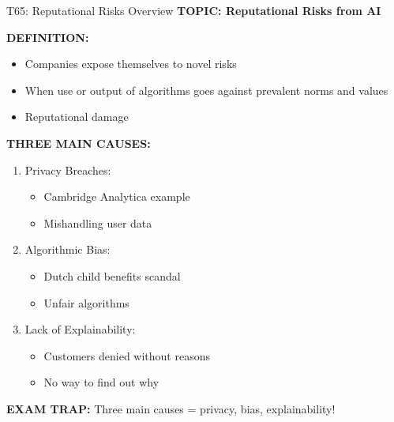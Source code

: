 \documentclass[8pt]{beamer}
\begin{document}
	\begin{frame}{T65: Reputational Risks Overview}
		\fontsize{6.5}{7.5}\selectfont
		\textbf{TOPIC: Reputational Risks from AI}
		
		\vspace{0.1cm}
		\textbf{DEFINITION:}
		\begin{itemize}
			\item Companies expose themselves to novel risks
			\item When use or output of algorithms goes against prevalent norms and values
			\item Reputational damage
		\end{itemize}
		
		\vspace{0.1cm}
		\textbf{THREE MAIN CAUSES:}
		\begin{enumerate}
			\item \textcolor{myblue}{Privacy Breaches:}
			\begin{itemize}
				\item Cambridge Analytica example
				\item Mishandling user data
			\end{itemize}
			\item \textcolor{myblue}{Algorithmic Bias:}
			\begin{itemize}
				\item Dutch child benefits scandal
				\item Unfair algorithms
			\end{itemize}
			\item \textcolor{myblue}{Lack of Explainability:}
			\begin{itemize}
				\item Customers denied without reasons
				\item No way to find out why
			\end{itemize}
		\end{enumerate}
		
		\textcolor{myred}{\textbf{EXAM TRAP:}} Three main causes = \textcolor{myblue}{privacy, bias, explainability}!
	\end{frame}
	
\end{document}
